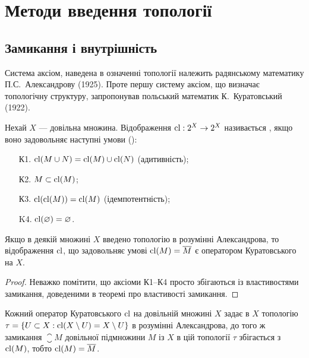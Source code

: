 \chapter{Методи введення топології}

\section{Замикання і внутрішність}

Система аксіом, наведена в означенні топології належить
радянському математику П.С.~Александрову (1925). Проте
першу систему аксіом, що визначає топологічну структуру,
запропонував польський математик К.~Куратовський (1922).

\begin{definition}
Нехай $X$ --- довільна множина. Відображення
$\operatorname{cl}: 2^X \to 2^X$ називається , якщо воно задовольняє наступні
умови ():
\begin{enumerate}
\item[К1.] $\operatorname{cl}(M \cup N) = \operatorname{cl}(M) \cup \operatorname{cl}(N)$ (адитивність);
\item[К2.] $M \subset \operatorname{cl}(M)$;
\item[К3.] $\operatorname{cl}(\operatorname{cl}(M)) = \operatorname{cl}(M)$ (ідемпотентність);
\item[K4.] $\operatorname{cl}(\varnothing) = \varnothing$.
\end{enumerate}
\end{definition}

\begin{theorem}
Якщо в деякій множині $X$ введено топологію в
розумінні Александрова, то відображення $\operatorname{cl}$, що
задовольняє умові $\operatorname{cl} (M) = \overline{M}$ є оператором Куратовського
на $X$.
\end{theorem}

\begin{proof}
Неважко помітити, що аксіоми К1--К4 просто
збігаються із властивостями замикання, доведеними в
теоремі про властивості замикання.
\end{proof}

\begin{theorem}
Кожний оператор Куратовського $\operatorname{cl}$ на
довільній множині $X$ задає в $X$ топологію
$\tau = \{ U \subset X: \operatorname{cl}(X \setminus U) = X \setminus U\}$ в розумінні Александрова, до
того ж замикання $\closure{M}$ довільної підмножини $M$ із $X$ в цій
топології $\tau$ збігається з $\operatorname{cl}(M)$, тобто $\operatorname{cl} (M) = \overline{M}$.
\end{theorem}

